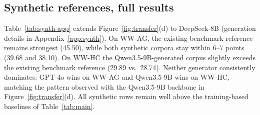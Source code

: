 

\subsection{Synthetic references, full results}
\label{app:synth-results}

Table~\ref{tab:synth-app} extends Figure~\ref{fig:transfer}(d) to DeepSeek-8B (generation details in Appendix~\ref{app:synth}). On \textsc{WW-AG}, the existing benchmark reference remains strongest (45.50), while both synthetic corpora stay within 6--7 points (39.68 and 38.10). On \textsc{WW-HC} the Qwen3.5-9B-generated corpus slightly exceeds the existing benchmark reference (29.89 vs.\ 28.74). Neither generator consistently dominates: GPT-4o wins on \textsc{WW-AG} and Qwen3.5-9B wins on \textsc{WW-HC}, matching the pattern observed with the Qwen3.5-9B backbone in Figure~\ref{fig:transfer}(d). All synthetic rows remain well above the training-based baselines of Table~\ref{tab:main}. 




